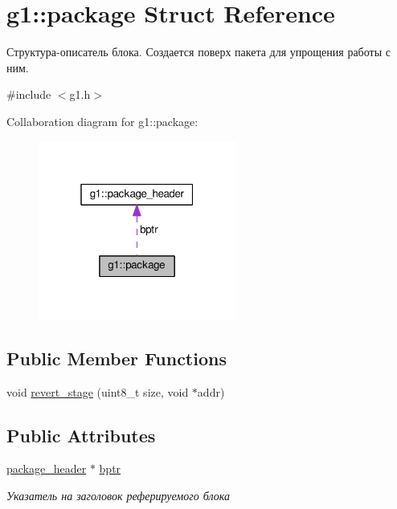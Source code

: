\hypertarget{structg1_1_1package}{}\section{g1\+:\+:package Struct Reference}
\label{structg1_1_1package}


Структура-\/описатель блока. Создается поверх пакета для упрощения работы с ним.  




{\ttfamily \#include $<$g1.\+h$>$}



Collaboration diagram for g1\+:\+:package\+:
\nopagebreak
\begin{figure}[H]
\begin{center}
\leavevmode
\includegraphics[width=184pt]{structg1_1_1package__coll__graph}
\end{center}
\end{figure}
\subsection*{Public Member Functions}
\begin{DoxyCompactItemize}
\item 
void \hyperlink{structg1_1_1package_a667ed03d442d2c9cfe28917c75525e4e}{revert\+\_\+stage} (uint8\+\_\+t size, void $\ast$addr)
\end{DoxyCompactItemize}
\subsection*{Public Attributes}
\begin{DoxyCompactItemize}
\item 
\hyperlink{structg1_1_1package__header}{package\+\_\+header} $\ast$ \hyperlink{structg1_1_1package_a1e75b5ccd00f3b8bd3c7958bc6d957e9}{bptr}\hypertarget{structg1_1_1package_a1e75b5ccd00f3b8bd3c7958bc6d957e9}{}\label{structg1_1_1package_a1e75b5ccd00f3b8bd3c7958bc6d957e9}

\begin{DoxyCompactList}\small\item\em Указатель на заголовок реферируемого блока \end{DoxyCompactList}\end{DoxyCompactItemize}


